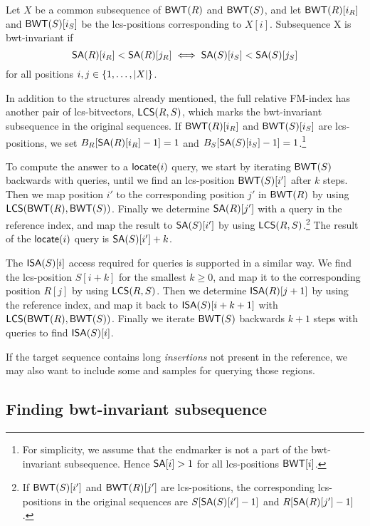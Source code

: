 \begin{definition}\label{def:bwt-invariant}
Let $X$ be a common subsequence of $\mathsf{BWT}(R)$ and $\mathsf{BWT}(S)$, and let
$\mathsf{BWT}(R)[i_{R}]$ and $\mathsf{BWT}(S)[i_{S}]$ be the lcs-positions corresponding to
$X[i]$. Subsequence X is bwt-invariant if
$$
\mathsf{SA}(R)[i_{R}] < \mathsf{SA}(R)[j_{R}] \iff \mathsf{SA}(S)[i_{S}] < \mathsf{SA}(S)[j_{S}]
$$
for all positions $i, j \in \{ 1, \dotsc, \lvert X \rvert \}$.
\end{definition}

In addition to the structures already mentioned, the full relative FM-index
has another pair of lcs-bitvectors, $\mathsf{LCS}(R,S)$, which marks the
bwt-invariant subsequence in the original sequences. If $\mathsf{BWT}(R)[i_{R}]$ and
$\mathsf{BWT}(S)[i_{S}]$ are lcs-positions, we set $B_{R}[\mathsf{SA}(R)[i_{R}]-1] = 1$ and
$B_{S}[\mathsf{SA}(S)[i_{S}]-1] = 1$.\footnote{For simplicity, we assume that the
endmarker is not a part of the bwt-invariant subsequence. Hence $\mathsf{SA}[i] > 1$
for all lcs-positions $\mathsf{BWT}[i]$.} 

To compute the answer to a $\mathsf{locate}(i)$ query, we start by iterating
$\mathsf{BWT}(S)$ backwards with \LF{} queries, until we find an lcs-position
$\mathsf{BWT}(S)[i']$ after $k$ steps. Then we map position $i'$ to the corresponding
position $j'$ in $\mathsf{BWT}(R)$ by using $\mathsf{LCS}(\mathsf{BWT}(R),\mathsf{BWT}(S))$. Finally we
determine $\mathsf{SA}(R)[j']$ with a \locate{} query in the reference index, and map
the result to $\mathsf{SA}(S)[i']$ by using $\mathsf{LCS}(R,S)$.\footnote{If $\mathsf{BWT}(S)[i']$
and $\mathsf{BWT}(R)[j']$ are lcs-positions, the corresponding lcs-positions in the
original sequences are $S[\mathsf{SA}(S)[i']-1]$ and $R[\mathsf{SA}(R)[j']-1]$.} The result
of the $\mathsf{locate}(i)$ query is $\mathsf{SA}(S)[i']+k$.

The $\mathsf{ISA}(S)[i]$ access required for \extract{} queries is supported in a
similar way. We find the lcs-position $S[i+k]$ for the smallest $k \ge 0$, and
map it to the corresponding position $R[j]$ by using $\mathsf{LCS}(R,S)$. Then we
determine $\mathsf{ISA}(R)[j+1]$ by using the reference index, and map it back to
$\mathsf{ISA}(S)[i+k+1]$ with $\mathsf{LCS}(\mathsf{BWT}(R),\mathsf{BWT}(S))$. Finally we iterate
$\mathsf{BWT}(S)$ backwards $k+1$ steps with \LF{} queries to find $\mathsf{ISA}(S)[i]$.

If the target sequence contains long
\emph{insertions} not present in the reference, we may also want to include
some \SA{} and \ISA{} samples for querying those regions.

\subsection{Finding bwt-invariant subsequence}

